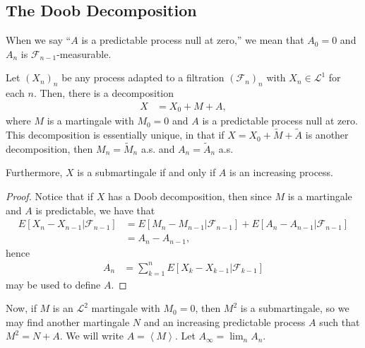 \documentclass[10pt]{mypackage}
\begin{document}
\subsection{The Doob Decomposition}%
When we say ``$A$ is a predictable process null at zero,'' we mean that $A_0 = 0$ and $A_n$ is $\mathcal{F}_{n-1}$-measurable.
\begin{theorem}
  Let $\left( X_n \right)_{n}$ be any process adapted to a filtration $\left( \mathcal{F}_n \right)_n$ with $X_n\in \mathcal{L}^1$ for each $n$. Then, there is a decomposition
  \begin{align*}
    X &= X_0 + M + A,
  \end{align*}
  where $M$ is a martingale with $M_0 = 0$ and $A$ is a predictable process null at zero. This decomposition is essentially unique, in that if $X = X_0 + \widetilde{M} + \widetilde{A}$ is another decomposition, then $M_n = \widetilde{M}_n$ a.s. and $A_n = \widetilde{A}_n$ a.s.

  Furthermore, $X$ is a submartingale if and only if $A$ is an increasing process.
\end{theorem}
\begin{proof}
  Notice that if $X$ has a Doob decomposition, then since $M$ is a martingale and $A$ is predictable, we have that
  \begin{align*}
    E\left[ X_n-X_{n-1}|\mathcal{F}_{n-1} \right] &= E\left[ M_n-M_{n-1}|\mathcal{F}_{n-1} \right] + E\left[ A_n-A_{n-1}|\mathcal{F}_{n-1} \right]\\
                                                  &= A_n-A_{n-1},
  \end{align*}
  hence
  \begin{align*}
    A_n &= \sum_{k=1}^{n}E\left[ X_k-X_{k-1}|\mathcal{F}_{k-1} \right]
  \end{align*}
  may be used to define $A$.
\end{proof}
Now, if $M$ is an $\mathcal{L}^2$ martingale with $M_0 = 0$, then $M^2$ is a submartingale, so we may find another martingale $N$ and an increasing predictable process $A$ such that $M^2 = N + A$. We will write $ A = \left\langle M \right\rangle $. Let $A_{\infty} = \lim_{n} A_n$.
\end{document}
